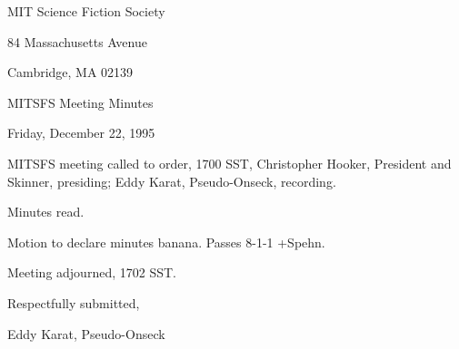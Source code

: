 \documentclass[12pt]{article}
\begin{document}
\begin{center}

MIT Science Fiction Society 

84 Massachusetts Avenue

Cambridge, MA 02139

\vspace{12pt}

MITSFS Meeting Minutes 

Friday, December 22, 1995

\end{center}
 
\vspace{18pt}

\setlength{\parskip}{6pt}

\noindent
MITSFS meeting called to order, 1700 SST,
Christopher Hooker, President and Skinner, presiding; Eddy Karat, Pseudo-Onseck, recording.

Minutes read.

Motion to declare minutes banana. Passes 8-1-1 +Spehn.

\vspace{12pt}

\noindent
Meeting adjourned, 1702 SST.

\vspace{18pt}

\centerline{Respectfully submitted,}
\centerline{Eddy Karat, Pseudo-Onseck}
\end{document}
